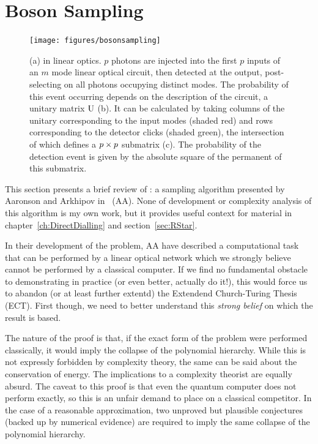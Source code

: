\section{Boson Sampling}
\label{sec:BosonSampling}
\begin{figure}
  \texttt{[image: figures/bosonsampling]}
  \caption[BosonSampling in linear optics]
  {(a) \bosonsampling{} in linear optics. \(p\) photons are injected into the
  first \(p\) inputs of an \(m\) mode linear optical circuit, then detected at
  the output, post-selecting on all photons occupying distinct modes. The
  probability of this event occurring depends on the description of the circuit,
  a unitary matrix \(\mathrm{U}\) (b). It can be calculated by taking columns of
  the unitary corresponding to the input modes (shaded red) and rows
  corresponding to the detector clicks (shaded green), the intersection of which
  defines a \(p \times p\) submatrix (c). The probability of the detection event is
  given by the absolute square of the permanent of this submatrix.}
  \label{fig:BosonSampling}
\end{figure}
This section presents a brief review of \bosonsampling{}: a sampling algorithm
presented by Aaronson and Arkhipov in~\cite{bosonsampling} (AA). None of
development or complexity analysis of this algorithm is my own work, but it
provides useful context for material in chapter~\ref{ch:DirectDialling} and
section~\ref{sec:RStar}.

In their development of the \bosonsampling{} problem, AA have described a
computational task that can be performed by a linear optical network which we
strongly believe cannot be performed by a classical computer. If we find no
fundamental obstacle to demonstrating \bosonsampling{} in practice (or even
better, actually do it!), this would force us to abandon (or at least further
extentd) the Extendend Church-Turing Thesis (ECT). First though, we need to
better understand this \emph{strong belief} on which the result is based.

The nature of the proof is that, if
the exact form of the \bosonsampling{} problem were performed classically, it
would imply the collapse of the polynomial hierarchy. While this is not
expressly forbidden by complexity theory, the same can be said about the
conservation of energy. The implications to a complexity theorist are equally
absurd. The caveat to this proof is that even the quantum computer does not
perform \bosonsampling{} exactly, so this is an unfair demand to place on a
classical competitor. In the case of a reasonable approximation, two unproved
but plausible conjectures (backed up by numerical evidence) are required to
imply the same collapse of the polynomial hierarchy.

